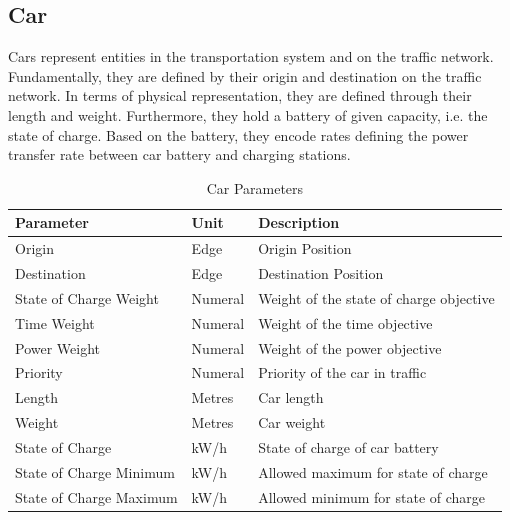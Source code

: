 \subsection{Car}

Cars represent entities in the transportation system and on the traffic network. Fundamentally, they are defined by their origin and destination on the traffic network. In terms of physical representation, they are defined through their length and weight. Furthermore, they hold a battery of given capacity, i.e. the state of charge. Based on the battery, they encode rates defining the power transfer rate between car battery and charging stations.

\begin{table}[h]
	\renewcommand{\arraystretch}{1.3}
	\caption{Car Parameters}
	\centering
	\begin{tabular}{lll}
		\hline
		\textbf{Parameter}                    & \textbf{Unit} & \textbf{Description} \\ \hline
		Origin                                & Edge          & Origin Position      \\
		Destination                           & Edge          & Destination Position \\
		State of Charge Weight                & Numeral       & Weight of the state of charge objective                     \\
		Time Weight                           & Numeral       & Weight of the time objective                     \\
		Power Weight                          & Numeral       & Weight of the power objective                     \\
		Priority                              & Numeral       & Priority of the car in traffic                  \\
		Length                        	      & Metres        & Car length             \\
		Weight                        	      & Metres        & Car weight              \\
		State of Charge                       & kW/h          & State of charge of car battery                     \\
		State of Charge Minimum               & kW/h          & Allowed maximum for state of charge                    \\
		State of Charge Maximum               & kW/h          & Allowed minimum for state of charge                     \\

\end{tabular}
\end{table}
